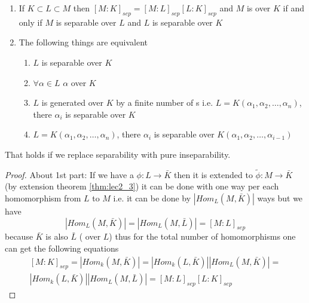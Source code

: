 \begin{theorem}
  \begin{enumerate}
  \item If $K \subset L \subset M$ then
    $\left[M:K\right]_{sep} = \left[M:L\right]_{sep}
    \left[L:K\right]_{sep}$
    and $M$ is  over $K$ if and only
    if $M$ is separable over $L$ and $L$ is separable over $K$
  \item The following things are equivalent
    \begin{enumerate}
    \item $L$ is separable over $K$ \label{thm:lec3_3:itm:1}
    \item $\forall \alpha \in L$ $\alpha$ 
      over $K$ \label{thm:lec3_3:itm:2}
    \item $L$ is generated over $K$ by a finite number of
      s i.e.
      $L = K\left(\alpha_1, \alpha_2, \dots, \alpha_n\right)$, there
      $\alpha_i$ is separable over $K$
      \label{thm:lec3_3:itm:3}
    \item   $L = K\left(\alpha_1, \alpha_2, \dots, \alpha_n\right)$, there
      $\alpha_i$ is separable over
      $K\left(\alpha_1, \alpha_2, \dots, \alpha_{i-1}\right)$
      \label{thm:lec3_3:itm:4}
    \end{enumerate}
  \end{enumerate}
  \begin{remark}
    That holds if we replace separability with pure inseparability.
  \end{remark}
  \begin{proof}
    About 1st part:
    If we have a  $\phi: L \to \bar{K}$ then
    it is extended to $\tilde{\phi}: M \to \bar{K}$ (by extension
    theorem \ref{thm:lec2_3}) it can be done with one way per each
    homomorphism from $L$ to $M$ i.e. it can be done by
    $\left|Hom_L\left(M, \bar{K}\right)\right|$ ways but we have
    \[
    \left|Hom_L\left(M, \bar{K}\right)\right| =
    \left|Hom_L\left(M, \bar{L}\right)\right| = \left[M:L\right]_{sep}
    \]
    because $\bar{K}$ is also
    $\bar{L}$ ( over $L$) thus for the
    total number of homomorphisms one can get the following 
    equations 
    \begin{eqnarray}
      \left[M:K\right]_{sep} = 
      \left|Hom_k\left(M, \bar{K}\right)\right| =
      \left|Hom_k\left(L, \bar{K}\right)\right|
      \left|Hom_L\left(M, \bar{K}\right)\right| =
      \nonumber \\
      \left|Hom_k\left(L, \bar{K}\right)\right|
      \left|Hom_L\left(M, \bar{L}\right)\right| =
      \left[M:L\right]_{sep} \left[L:K\right]_{sep}
      \nonumber
    \end{eqnarray}


\end{proof}
\end{theorem}
